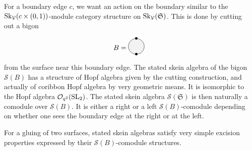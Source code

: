 \documentclass[pdftex]{sigma}%
\numberwithin{equation}{section}
\newcommand{\Oq}{\mathcal{O}_{q^2}({\rm SL}_2)}
\begin{document}
For a boundary edge $c$, we want an action on the boundary similar to the ${\rm Sk}_\mathcal{V}(c\times(0,1))$-module category structure on ${\rm Sk}_\mathcal{V}(\mathfrak{S})$. This is done by cutting out a bigon
\[
B= \begin{tikzpicture}[scale = 0.8, baseline = -5pt]
\fill [gray!10] (0,0) circle (0.5);
\draw (0,0) circle (0.5);
\node at (0,-0.5){\small $\bullet$};
\node at (0,0.5){\small $\bullet$};
\end{tikzpicture}
\]
 from the surface near this boundary edge. The stated skein algebra of the bigon $\mathscr{S}(B)$ has a structure of Hopf algebra given by the cutting construction, and actually of coribbon Hopf algebra by very geometric means. It is isomorphic to the Hopf algebra $\Oq$. The stated skein algebra $\mathscr{S}(\mathfrak{S})$ is then naturally a comodule over $\mathscr{S}(B)$. It is either a right or a left $\mathscr{S}(B)$-comodule depending on whether one sees the boundary edge at the right or at the left.

For a gluing of two surfaces, stated skein algebras satisfy very simple excision properties expressed by their $\mathscr{S}(B)$-comodule structures.
\end{document}
